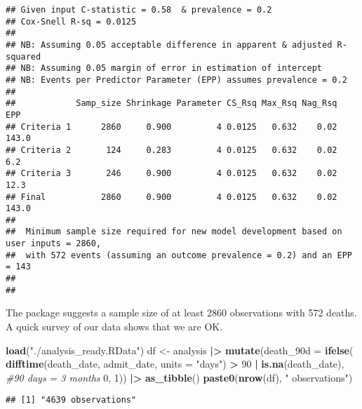 \documentclass[
]{article}
\newenvironment{Shaded}{\begin{snugshade}}{\end{snugshade}}
\newcommand{\AttributeTok}[1]{\textcolor[rgb]{0.13,0.29,0.53}{#1}}
\newcommand{\CommentTok}[1]{\textcolor[rgb]{0.56,0.35,0.01}{\textit{#1}}}
\newcommand{\DecValTok}[1]{\textcolor[rgb]{0.00,0.00,0.81}{#1}}
\newcommand{\FunctionTok}[1]{\textcolor[rgb]{0.13,0.29,0.53}{\textbf{#1}}}
\newcommand{\NormalTok}[1]{#1}
\newcommand{\OtherTok}[1]{\textcolor[rgb]{0.56,0.35,0.01}{#1}}
\newcommand{\SpecialCharTok}[1]{\textcolor[rgb]{0.81,0.36,0.00}{\textbf{#1}}}
\newcommand{\StringTok}[1]{\textcolor[rgb]{0.31,0.60,0.02}{#1}}
\begin{document}
\begin{verbatim}
## Given input C-statistic = 0.58  & prevalence = 0.2  
## Cox-Snell R-sq = 0.0125  
##  
## NB: Assuming 0.05 acceptable difference in apparent & adjusted R-squared 
## NB: Assuming 0.05 margin of error in estimation of intercept 
## NB: Events per Predictor Parameter (EPP) assumes prevalence = 0.2  
##  
##            Samp_size Shrinkage Parameter CS_Rsq Max_Rsq Nag_Rsq   EPP
## Criteria 1      2860     0.900         4 0.0125   0.632    0.02 143.0
## Criteria 2       124     0.283         4 0.0125   0.632    0.02   6.2
## Criteria 3       246     0.900         4 0.0125   0.632    0.02  12.3
## Final           2860     0.900         4 0.0125   0.632    0.02 143.0
##  
##  Minimum sample size required for new model development based on user inputs = 2860, 
##  with 572 events (assuming an outcome prevalence = 0.2) and an EPP = 143 
##  
## 
\end{verbatim}

The package suggests a sample size of at least 2860 observations with
572 deaths. A quick survey of our data shows that we are OK.

\begin{Shaded}
\begin{Highlighting}[]
\FunctionTok{load}\NormalTok{(}\StringTok{"./analysis\_ready.RData"}\NormalTok{)}
\NormalTok{df }\OtherTok{\textless{}{-}}\NormalTok{ analysis }\SpecialCharTok{|\textgreater{}}
  \FunctionTok{mutate}\NormalTok{(}\AttributeTok{death\_90d =} \FunctionTok{ifelse}\NormalTok{(}
    \FunctionTok{difftime}\NormalTok{(death\_date, admit\_date, }\AttributeTok{units =} \StringTok{"days"}\NormalTok{) }\SpecialCharTok{\textgreater{}} \DecValTok{90} \SpecialCharTok{|} \FunctionTok{is.na}\NormalTok{(death\_date), }\CommentTok{\#90 days = 3 months}
    \DecValTok{0}\NormalTok{,}
    \DecValTok{1}\NormalTok{)) }\SpecialCharTok{|\textgreater{}}
  \FunctionTok{as\_tibble}\NormalTok{()}
\FunctionTok{paste0}\NormalTok{(}\FunctionTok{nrow}\NormalTok{(df), }\StringTok{" observations"}\NormalTok{)}
\end{Highlighting}
\end{Shaded}

\begin{verbatim}
## [1] "4639 observations"
\end{verbatim}

\begin{Shaded}
\end{Shaded}
\end{document}
